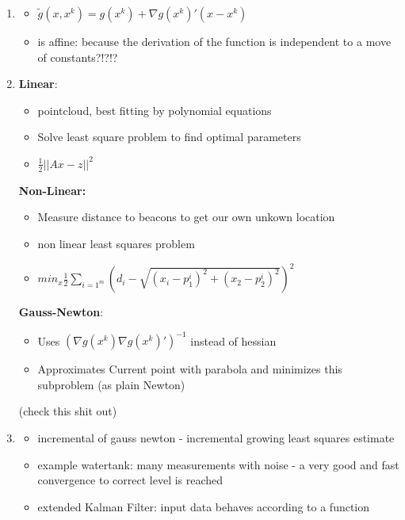 \documentclass{report}
\begin{document}
\begin{enumerate}
\item \begin{itemize}
	\item $\tilde{g}(x, x^k) = g(x^k) + \nabla g(x^k)'(x - x^k)$
	\item is affine: because the derivation of the function is independent to a move of constants?!?!?
\end{itemize}
\item \textbf{Linear}:
\begin{itemize}
	\item pointcloud, best fitting by polynomial equations
	\item Solve least square problem to find optimal parameters
	\item $\frac{1}{2}|| Ax - z ||^2$
\end{itemize} 
\textbf{Non-Linear:}
\begin{itemize}
	\item Measure distance to beacons to get our own unkown location
	\item non linear least squares problem
	\item $min_x \frac{1}{2} \sum_{i = 1^m} (d_i - \sqrt{(x_i - p_1^i)^2 + (x_2 - p_2^i)^2})^2$
\end{itemize} 
\textbf{Gauss-Newton}:
\begin{itemize}
	\item Uses $(\nabla g(x^k)\nabla g(x^k)')^{-1}$ instead of hessian
	\item Approximates Current point with parabola and minimizes this subproblem (as plain Newton)
\end{itemize}
(check this shit out)
\item \begin{itemize}
	\item incremental of gauss newton - incremental growing least squares estimate
	\item example watertank: many measurements with noise - a very good and fast convergence to correct level is reached
	\item extended Kalman Filter: input data behaves according to a function
\end{itemize}


\end{enumerate}
\end{document}

